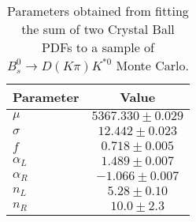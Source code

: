 \begin{table}[h]
  \centering
  \begin{tabular}{lc}
      \toprule
      Parameter & Value \\
      \midrule
      $\mu$ & $5367.330 \pm 0.029$ \\
      $\sigma$ & $12.442 \pm 0.023$ \\
      $f$ & $0.718 \pm 0.005$ \\
      $\alpha_L$ & $1.489 \pm 0.007$ \\
      $\alpha_R$ & $-1.066 \pm 0.007$ \\
      $n_L$ & $5.28 \pm 0.10$ \\
      $n_R$ & $10.0 \pm 2.3$ \\
  \bottomrule
  \end{tabular}
  \caption{Parameters obtained from fitting the sum of two Crystal Ball PDFs to a sample of $B^0_s \to D(K\pi)K^{*0}$ Monte Carlo.}
\label{tab:signal_Bs_MC_params}
\end{table}

